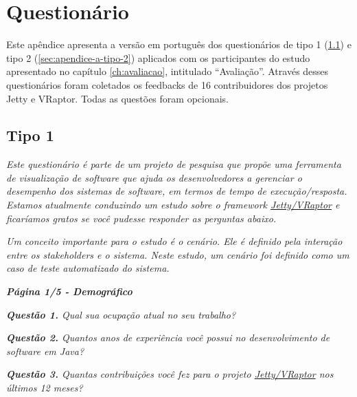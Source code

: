 \apendice
\chapter{Questionário} \label{ch:apendice-a}

Este apêndice apresenta a versão em português dos questionários de tipo 1 (\ref{sec:apendice-a-tipo-1}) e tipo 2 (\ref{sec:apendice-a-tipo-2}) aplicados com os participantes do estudo apresentado no capítulo \ref{ch:avaliacao}, intitulado ``Avaliação''. Através desses questionários foram coletados os feedbacks de 16 contribuidores dos projetos Jetty e VRaptor. Todas as questões foram opcionais.

\section{Tipo 1} \label{sec:apendice-a-tipo-1}

\begin{framed}
  \noindent \textit{\textbf{\toolName}}
  \par
  \par
  \noindent \textit{Este questionário é parte de um projeto de pesquisa que propõe uma ferramenta de visualização de software que ajuda os desenvolvedores a gerenciar o desempenho dos sistemas de software, em termos de tempo de execução/resposta. Estamos atualmente conduzindo um estudo sobre o framework \underline{Jetty/VRaptor} e ficaríamos gratos se você pudesse responder as perguntas abaixo.}
  \par
  \noindent \textit{Um conceito importante para o estudo é o cenário. Ele é definido pela interação entre os stakeholders e o sistema. Neste estudo, um cenário foi definido como um caso de teste automatizado do sistema.}
\end{framed}
	
\begin{framed}
	\noindent \textit{\textbf{Página 1/5 - Demográfico}}
	\par
	\noindent \textit{\textbf{Questão 1.} Qual sua ocupação atual no seu trabalho?}
	\par
	\noindent \textit{\textbf{Questão 2.} Quantos anos de experiência você possui no desenvolvimento de software em Java?}
	\par
	\noindent \textit{\textbf{Questão 3.} Quantas contribuições você fez para o projeto \underline{Jetty/VRaptor} nos últimos 12 meses?}
\end{framed}

